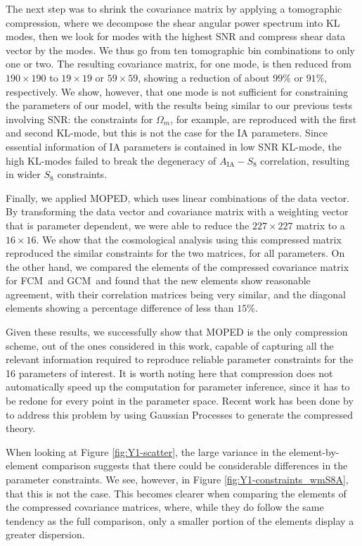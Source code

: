 \documentclass[twocolumn,nofootinbib]{\docclass}
\newcommand{\rf}[1]{Figure \ref{fig:#1}}
\newcommand\full{FCM}
\newcommand\gaussian{GCM}
\begin{document}
	The next step was to shrink the covariance matrix by applying a tomographic compression, where we decompose the shear angular power spectrum into KL modes, then we look for modes with the highest SNR and compress shear data vector by the modes. We thus go from ten tomographic bin combinations to only one or two. The resulting covariance matrix, for one mode, is then reduced from $190 \times 190$ to $19 \times 19$ or $59 \times 59$, showing a reduction of about $99\%$ or $91\%$, respectively. We show, however, that one mode is not sufficient for constraining the parameters of our model, with the results being similar to our previous tests involving SNR: the constraints for $\Omega_m$, for example, are reproduced with the first and second KL-mode, but this is not the case for the IA parameters. Since essential information of IA parameters is contained in low SNR KL-mode, the high KL-modes failed to break the degeneracy of $A_{\mathrm{IA}}-S_8$ correlation, resulting in wider $S_8$ constraints. 
	
	Finally, we applied MOPED, which uses linear combinations of the data vector. By transforming the data vector and covariance matrix with a weighting vector that is parameter dependent, we were able to reduce the $227 \times 227$ matrix to a $16 \times 16$.%
	We show that the cosmological analysis using this compressed matrix reproduced the similar constraints for the two matrices, for all parameters. On the other hand, we compared the elements of the compressed covariance matrix for \full\ and \gaussian\ and found that the new elements show reasonable agreement, with their correlation matrices being very similar, and the diagonal elements showing a percentage difference of less than $15\%$.
	
	Given these results, we successfully show that MOPED is the only compression scheme, out of the ones considered in this work, capable of capturing all the relevant information required to reproduce reliable parameter constraints for the 16 parameters of interest. It is worth noting here that compression does not automatically speed up the computation for parameter inference, since it has to be redone for every point in the parameter space. Recent work has been done by \cite{Mootoovaloo:2020} to address this problem by using Gaussian Processes to generate the compressed theory.
	
	When looking at \rf{Y1-scatter}, the large variance in the element-by-element comparison suggests that there could be considerable differences in the parameter constraints. We see, however, in \rf{Y1-constraints_wmS8A}, that this is not the case. This becomes clearer when comparing the elements of the compressed covariance matrices, where, while they do follow the same tendency as the full comparison, only a smaller portion of the elements display a greater dispersion.
	
\end{document}
